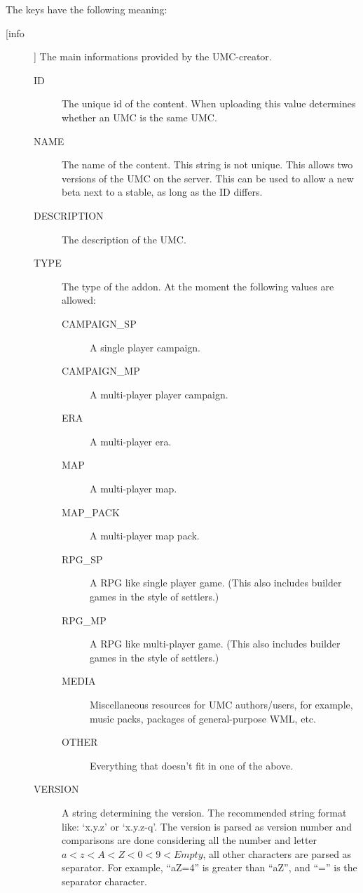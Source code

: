 The keys have the following meaning:
\begin{description}

\item [[info]] The main informations provided by the UMC-creator.

\begin{description}
\item[ID]
	The unique id of the content. When uploading this value determines
	whether an UMC is the same UMC.

\item[NAME]
  The name of the content. This string is not unique. This allows two
  versions of the UMC on the server. This can be used to allow a new beta
  next to a stable, as long as the ID differs.

\item[DESCRIPTION]
  The description of the UMC.

\item[TYPE]
	The type of the addon. At the moment the following values are allowed:
	\begin{description}
	\item[CAMPAIGN\_SP] A single player campaign.
	\item[CAMPAIGN\_MP] A multi-player player campaign.
	\item[ERA] A multi-player era.
	\item[MAP] A multi-player map.
	\item[MAP\_PACK] A multi-player map pack.
	\item[RPG\_SP]
		A RPG like single player game. (This also includes builder games in
		the style of settlers.)
	\item[RPG\_MP]
		A RPG like multi-player game. (This also includes builder games in
		the style of settlers.)
	\item[MEDIA]
		 Miscellaneous resources for UMC authors/users, for example, music packs, packages of general-purpose WML, etc.
	\item[OTHER] Everything that doesn't fit in one of the above.
	\end{description}

\item[VERSION]
	A string determining the version. The recommended string format like:
	`x.y.z' or `x.y.z-q'. The version is parsed as version number and 
comparisons are done considering all the number and letter
$a < z < A < Z < 0 < 9 < Empty$, all other characters are parsed as separator.
For example, ``aZ=4'' is greater than ``aZ'', and ``='' is the separator character.


\end{description}
\end{description}
